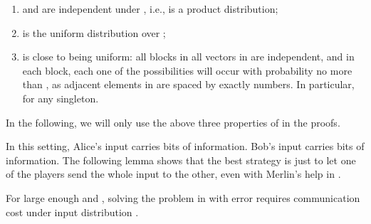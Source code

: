 \documentclass[11pt]{article}
\begin{document}
{\begin{enumerate}
	\item
		 and  are independent under , i.e.,  is a product distribution;
	\item
		 is the uniform distribution over ;
	\item
		 is close to being uniform: all  blocks in all  vectors in  are independent, and in each block, each one of the  possibilities will occur with probability no more than , as adjacent elements in  are spaced by exactly  numbers. In particular,  for any singleton. 
\end{enumerate}

In the following, we will only use the above three properties of  in the proofs. }
In this setting, Alice's input carries  bits of information. Bob's input carries  bits of information. The following lemma shows that the best strategy is just to let one of the players send the whole input to the other, even with Merlin's help in \mm{}.


\begin{lemma}\label{lowermi}
For large enough  and , solving the \mi{} problem in \mm{} with error  requires communication cost  under input distribution .
\end{lemma}
\end{document}

